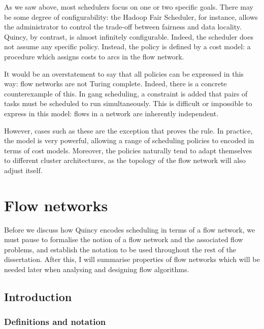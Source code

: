 As we saw above, most schedulers focus on one or two specific goals. There may be some degree of configurability: the Hadoop Fair Scheduler, for instance, allows the administrator to control the trade-off between fairness and data locality. Quincy, by contrast, is almost infinitely configurable. Indeed, the scheduler does not assume any specific policy. Instead, the policy is defined by a cost model: a procedure which assigns costs to arcs in the flow network.

It would be an overstatement to say that all policies can be expressed in this way: flow networks are not Turing complete. Indeed, there is a concrete counterexample of this. In gang scheduling\footnotemark, a constraint is added that pairs of tasks must be scheduled to run simultaneously. This is difficult or impossible to express in this model: flows in a network are inherently independent.

However, cases such as these are the exception that proves the rule. In practice, the model is very powerful, allowing a range of scheduling policies to encoded in terms of cost models. Moreover, the policies naturally tend to adapt themselves to different cluster architectures, as the topology of the flow network will also adjust itself.


\section{Flow networks} \label{prep-flow}

Before we discuss how Quincy encodes scheduling in terms of a flow network, we must pause to formalise the notion of a flow network and the associated flow problems, and establish the notation to be used throughout the rest of the dissertation. After this, I will summarise properties of flow networks which will be needed later when analysing and designing flow algorithms.

\subsection{Introduction}

\subsubsection{Definitions and notation}

